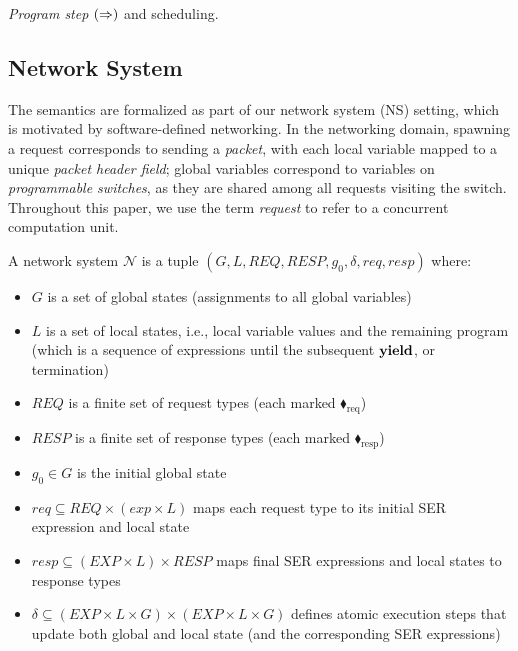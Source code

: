 \noindent\textit{Program step} $(\mathrel{\Rightarrow})$ and scheduling.


   
    
    
\subsection{Network System}    
    
The semantics are formalized as part of our network system (NS) setting, which is motivated by software-defined networking. In the networking domain, spawning a request corresponds to sending a \textit{packet}, with each local variable mapped to a unique \textit{packet header field}; global variables correspond to variables on \textit{programmable switches}, as they are shared among all requests visiting the switch. Throughout this paper, we use the term \emph{request} to refer to a concurrent computation unit. 
    
   
A network system $\mathcal{N}$ is a tuple $(G, L, \mathit{REQ}, \mathit{RESP}, g_0, \delta, \mathit{req}, \mathit{resp})$ where:
\begin{itemize}
\item $G$ is a set of global states (assignments to all global variables)
\item $L$ is a set of local states, i.e., local variable values and the remaining program (which is a sequence of expressions until the subsequent \(\textbf{yield}\), or termination)
\item $\mathit{REQ}$ is a finite set of request types (each marked {\color{ForestGreen}$\blacklozenge_\text{req}$})
\item $\mathit{RESP}$ is a finite set of response types (each marked {\color{red}$\blacklozenge_\text{resp}$})
\item $g_0 \in G$ is the initial global state
\item $\mathit{req} \subseteq \mathit{REQ} \times (\mathit{exp} \times L)$ maps each request type to its initial SER expression and  local state
\item $\mathit{resp} \subseteq (\mathit{EXP} \times L) \times \mathit{RESP}$ maps final SER expressions and local states to response types
\item $\delta \subseteq (\mathit{EXP} \times L \times G) \times (\mathit{EXP} \times L \times G)$ defines atomic execution steps that update both global and local state (and the corresponding SER expressions)
\end{itemize}

